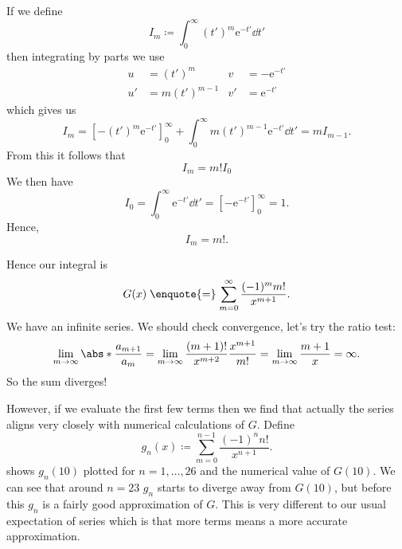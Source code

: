 \documentclass[fleqn]{NotesClass}
\newcommand*{\e}{\mathrm{e}}
\begin{document}
    If we define
    \begin{equation}
        I_m \coloneqq \int_0^\infty (t')^m \e^{-t'}\dd{t'}
    \end{equation}
    then integrating by parts we use
    \begin{align}
        u &= (t')^m & v &= -\e^{-t'}\\
        u' &= m(t')^{m-1} & v' &= \e^{-t'}
    \end{align}
    which gives us
    \begin{equation}
        I_m = [-(t')^m\e^{-t'}]_0^\infty + \int_0^\infty m(t')^{m-1}\e^{-t'}\dd{t'} = mI_{m-1}.
    \end{equation}
    From this it follows that
    \begin{equation}
        I_m = m!I_0
    \end{equation}
    We then have
    \begin{equation}
        I_0 = \int_0^{\infty} \e^{-t'} \dd{t'} = [-\e^{-t'}]_{0}^{\infty} = 1.
    \end{equation}
    Hence,
    \begin{equation}
        I_m = m!.
    \end{equation}

    Hence our integral is
    \begin{equation}
        G(x) \mathrel{\text{\enquote{=}}} \sum_{m=0}^{\infty} \frac{(-1)^mm!}{x^{m+1}}.
    \end{equation}
    We have an infinite series.
    We should check convergence, let's try the ratio test:
    \begin{equation}
        \lim_{m\to\infty} \abs*{\frac{a_{m+1}}{a_m}} = \lim_{m\to\infty} \frac{(m+1)!}{x^{m+2}}\frac{x^{m+1}}{m!} = \lim_{m\to\infty} \frac{m+1}{x} = \infty.
    \end{equation}
    So the sum diverges!
    
    However, if we evaluate the first few terms then we find that actually the series aligns very closely with numerical calculations of \(G\).
    Define
    \begin{equation}
        g_n(x) \coloneqq \sum_{m=0}^{n-1} \frac{(-1)^nn!}{x^{n+1}}.
    \end{equation}
     shows \(g_n(10)\) plotted for \(n = 1, \dotsc, 26\) and the numerical value of \(G(10)\).
    We can see that around \(n=23\) \(g_n\) starts to diverge away from \(G(10)\), but before this \(g_n\) is a fairly good approximation of \(G\).
    This is very different to our usual expectation of series which is that more terms means a more accurate approximation.
    
\end{document}
